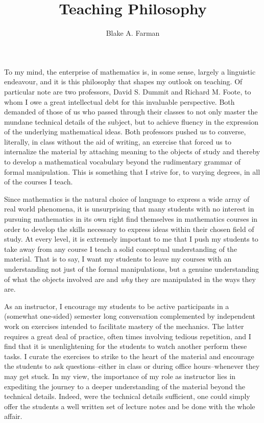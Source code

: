 \documentclass[11pt]{amsart}
\title{Teaching Philosophy}
\author{Blake A. Farman}
\date{}
\begin{document}
\maketitle

To my mind, the enterprise of mathematics is, in some sense, largely a linguistic endeavour, and it is this philosophy that shapes my outlook on teaching.
Of particular note are two professors, David S. Dummit and Richard M. Foote, to whom I owe a great intellectual debt for this invaluable perspective.
Both demanded of those of us who passed through their classes to not only master the mundane technical details of the subject, but to achieve fluency in the expression of the underlying mathematical ideas.
Both professors pushed us to converse, literally, in class without the aid of writing, an exercise that forced us to internalize the material by attaching meaning to the objects of study and thereby to develop a mathematical vocabulary beyond the rudimentary grammar of formal manipulation.
This is something that I strive for, to varying degrees, in all of the courses I teach.

Since mathematics is the natural choice of language to express a wide array of real world phenomena, it is unsurprising that many students with no interest in pursuing mathematics in its own right find themselves in mathematics courses in order to develop the skills necessary to express ideas within their chosen field of study.
At every level, it is extremely important to me that I push my students to take away from any course I teach a solid conceptual understanding of the material.
That is to say, I want my students to leave my courses with an understanding not just of the formal manipulations, but a genuine understanding of what the objects involved are and \textit{why} they are manipulated in the ways they are.

As an instructor, I encourage my students to be active participants in a (somewhat one-sided) semester long conversation complemented by independent work on exercises intended to facilitate mastery of the mechanics.
The latter requires a great deal of practice, often times involving tedious repetition, and I find that it is unenlightening for the students to watch another perform these tasks.
I curate the exercises to strike to the heart of the material and encourage the students to ask questions--either in class or during office hours--whenever they may get stuck.
In my view, the importance of my role as instructor lies in expediting the journey to a deeper understanding of the material beyond the technical details.
Indeed, were the technical details sufficient, one could simply offer the students a well written set of lecture notes and be done with the whole affair.
\end{document}
